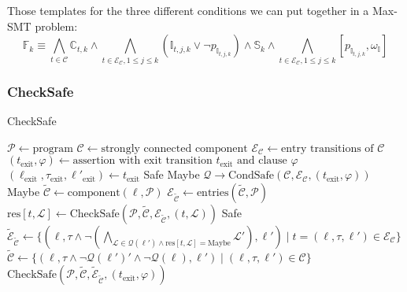 \documentclass[12pt]{scrartcl}
\begin{document}
Those templates for the three different conditions we can put together in a Max-SMT problem:
\[ \mathbb{F}_k \equiv \bigwedge_{t \in \mathcal{C}} \mathbb{C}_{t, k} \wedge \bigwedge_{t \in \mathcal{E}_\mathcal{C}, 1 \leq j \leq k}{(\mathbb{I}_{t,j,k} \vee \neg p_{\mathbb{I}_{t,j,k}})} \wedge \mathbb{S}_k \wedge \bigwedge_{t \in \mathcal{E}_\mathcal{C}, 1 \leq j \leq k}{[p_{\mathbb{I}_{t,j,k}}, \omega_\mathbb{I}]} \]

\subsubsection{CheckSafe}

\begin{algorithm}
\caption{CheckSafe}\label{checksafe}
\begin{algorithmic}[1]
\State $\mathcal{P} \gets \text{program}$
\State $\mathcal{C} \gets \text{strongly connected component}$
\State $\mathcal{E}_\mathcal{C} \gets \text{entry transitions of } \mathcal{C}$
\State $(t_\text{exit}, \varphi) \gets \text{assertion with exit transition } t_\text{exit} \text{ and clause } \varphi$
\State $(\ell_\text{exit}, \tau_\text{exit}, \ell'_\text{exit}) \gets t_\text{exit}$
  \Return Safe
  \Return Maybe
\EndIf
\State $\mathcal{Q} \rightarrow \text{CondSafe}(\mathcal{C}, \mathcal{E}_\mathcal{C}, (t_\text{exit}, \varphi))$
  \Return Maybe
\EndIf
{}
  \State $\tilde{\mathcal{C}} \gets \text{component}(\ell, \mathcal{P})$
  \State $\mathcal{E}_{\tilde{\mathcal{C}}} \gets \text{entries}(\tilde{\mathcal{C}}, \mathcal{P})$
  \State $\text{res}[t, \mathcal{L}] \gets \text{CheckSafe}(\mathcal{P}, \tilde{\mathcal{C}}, \mathcal{E}_{\tilde{\mathcal{C}}}, (t, \mathcal{L}))$
\EndFor
{}
  \Return Safe
\Else
  \State $\tilde{\mathcal{E}}_{\tilde{\mathcal{C}}} \gets \lbrace (\ell, \tau \wedge \neg (\bigwedge_{\mathcal{L} \in \mathcal{Q}(\ell') \wedge \text{res}[t, \mathcal{L}]=\text{Maybe}}{\mathcal{L}'}), \ell') \mid t = (\ell, \tau, \ell') \in \mathcal{E}_\mathcal{C} \rbrace$
  \State $\tilde{\mathcal{C}} \gets \lbrace (\ell, \tau \wedge \neg\mathcal{Q}(\ell')' \wedge \neg\mathcal{Q}(\ell), \ell') \mid (\ell, \tau, \ell') \in \mathcal{C} \rbrace$
\EndIf
\Return $\text{CheckSafe}(\mathcal{P}, \tilde{\mathcal{C}}, \tilde{\mathcal{E}}_{\tilde{\mathcal{C}}}, (t_\text{exit}, \varphi))$
\end{algorithmic}
\end{algorithm}
\end{document}
